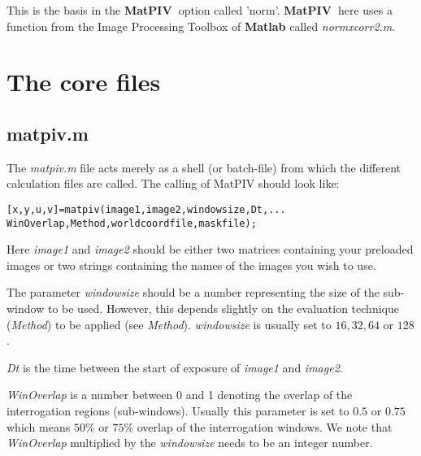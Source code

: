 \documentclass{book}
\newcommand{\matpiv}{{\bf MatPIV~}}
\begin{document}
This is the basis in the \matpiv option called 'norm'. \matpiv here uses
a function from the Image Processing Toolbox of {\bf Matlab} called {\em
normxcorr2.m}.

%


\section{The core files}
\subsection{matpiv.m}
The {\it matpiv.m } file acts merely as a shell (or batch-file) from
which the different calculation files are called. The calling of
MatPIV should look like:
\begin{verbatim}
[x,y,u,v]=matpiv(image1,image2,windowsize,Dt,...
WinOverlap,Method,worldcoordfile,maskfile);
\end{verbatim}

Here {\em image1} and {\em image2} should be either two matrices
containing your preloaded images or two strings containing the names of
the images you wish to use.

The parameter {\em windowsize} should be a number representing the size
of the sub-window to be used. However, this depends slightly on the
evaluation technique ({\em Method}) to be applied (see {\em Method}).
{\em windowsize} is usually set to $16, 32, 64$ or $128$. 

{\em Dt} is the time between the start of exposure of {\em image1} and
{\em image2}.

{\em WinOverlap} is a number between 0 and 1 denoting the overlap of the
interrogation regions (sub-windows). Usually this parameter is set to
$0.5$ or $0.75$ which means $50\%$ or $75\%$ overlap of the
interrogation windows. We note that {\em WinOverlap} multiplied by the
{\em windowsize} needs to be an integer number.
\end{document}
